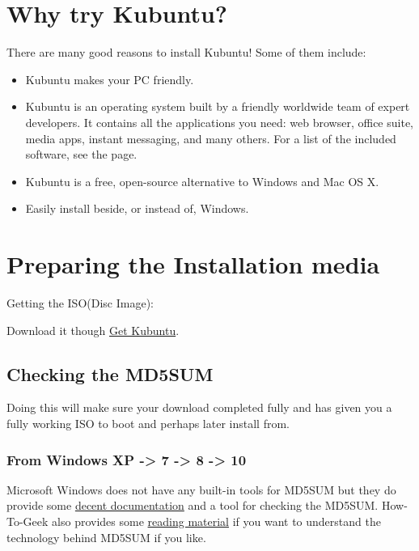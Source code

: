 \documentclass[letterpaper,10pt,english]{sphinxmanual}
\begin{document}
\section{Why try Kubuntu?}
\label{docs/installation:why-try-kubuntu}
There are many good reasons to install Kubuntu!
Some of them include:
\begin{itemize}
\item {} 
Kubuntu makes your PC friendly.

\item {} 
Kubuntu is an operating system built by a friendly worldwide team of expert developers.
It contains all the applications you need: web browser, office suite, media apps,
instant messaging, and many others. For a list of the included software, see the
{\hyperref[docs/software:software\string-link]{}} page.

\item {} 
Kubuntu is a free, open-source alternative to Windows and Mac OS X.

\item {} 
Easily install beside, or instead of, Windows.

\end{itemize}


\section{Preparing the Installation media}
\label{docs/installation:preparing-the-installation-media}\label{docs/installation:get-kubuntu-link}
Getting the ISO(Disc Image):

Download it though \href{http://www.kubuntu.org/getkubuntu/}{Get Kubuntu}.


\subsection{Checking the MD5SUM}
\label{docs/installation:checking-the-md5sum}\label{docs/installation:checksum-link}
Doing this will make sure your download completed fully and has given you a fully working ISO to boot and perhaps later install from.


\subsubsection{From Windows XP -\textgreater{} 7 -\textgreater{} 8 -\textgreater{} 10}
\label{docs/installation:from-windows-xp-7-8-10}
Microsoft Windows does not have any built-in tools for MD5SUM but they do
provide some \href{https://support.microsoft.com/en-us/kb/841290}{decent documentation} and a tool for checking the MD5SUM. How-To-Geek also provides some \href{http://www.howtogeek.com/67241/htg-explains-what-are-md5-sha-1-hashes-and-how-do-i-check-them/}{reading material} if you want to understand the technology behind MD5SUM if you like.
\end{document}
